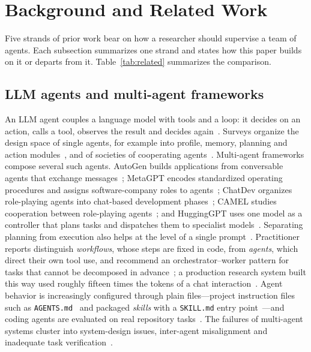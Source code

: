 \section{Background and Related Work}
\label{sec:related}

Five strands of prior work bear on how a researcher should supervise a team of agents.
Each subsection summarizes one strand and states how this paper builds on it or departs
from it. Table~\ref{tab:related} summarizes the comparison.

\subsection{LLM agents and multi-agent frameworks}
\label{sec:rw-agents}

An LLM agent couples a language model with tools and a loop: it decides on an action,
calls a tool, observes the result and decides again~\cite{yao2023react}. Surveys
organize the design space of single agents, for example into profile, memory, planning
and action modules~\cite{wang2024survey}, and of societies of cooperating
agents~\cite{xi2025rise}. Multi-agent frameworks compose several such
agents. AutoGen builds applications from conversable agents that exchange
messages~\cite{wu2023autogen}; MetaGPT encodes standardized operating procedures and
assigns software-company roles to agents~\cite{hong2023metagpt}; ChatDev organizes
role-playing agents into chat-based development phases~\cite{qian2024chatdev}; CAMEL
studies cooperation between role-playing agents~\cite{li2023camel}; and HuggingGPT uses
one model as a controller that plans tasks and dispatches them to specialist
models~\cite{shen2023hugginggpt}. Separating planning from execution also helps at the
level of a single prompt~\cite{wang2023planandsolve}. Practitioner reports distinguish
\textit{workflows}, whose steps are fixed in code, from \textit{agents}, which direct
their own tool use, and recommend an orchestrator--worker pattern for tasks that cannot
be decomposed in advance~\cite{schluntz2024building}; a production research system built
this way used roughly fifteen times the tokens of a chat interaction~\cite{hadfield2025multiagent}.
Agent behavior is increasingly configured through plain files---project instruction files
such as \texttt{AGENTS.md}~\cite{agentsmd2025} and packaged \textit{skills} with a
\texttt{SKILL.md} entry point~\cite{agentskills2025spec}---and coding agents are evaluated
on real repository tasks~\cite{jimenez2023swebench}. The failures of multi-agent systems
cluster into system-design issues, inter-agent misalignment and inadequate task
verification~\cite{cemri2025multiagent}.

